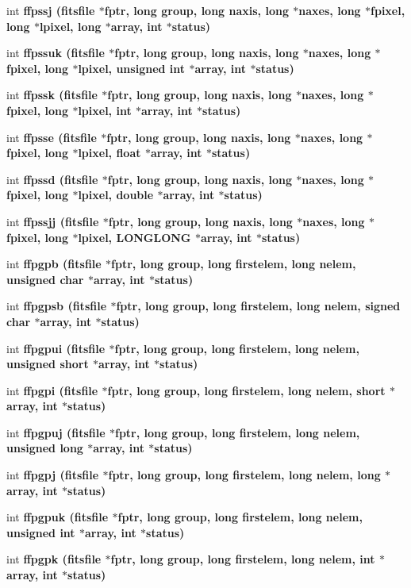 \begin{CompactItemize}
\item 
int \bf{ffpssj} (\bf{fitsfile} $\ast$fptr, long group, long naxis, long $\ast$naxes, long $\ast$fpixel, long $\ast$lpixel, long $\ast$array, int $\ast$status)
\item 
int \bf{ffpssuk} (\bf{fitsfile} $\ast$fptr, long group, long naxis, long $\ast$naxes, long $\ast$fpixel, long $\ast$lpixel, unsigned int $\ast$array, int $\ast$status)
\item 
int \bf{ffpssk} (\bf{fitsfile} $\ast$fptr, long group, long naxis, long $\ast$naxes, long $\ast$fpixel, long $\ast$lpixel, int $\ast$array, int $\ast$status)
\item 
int \bf{ffpsse} (\bf{fitsfile} $\ast$fptr, long group, long naxis, long $\ast$naxes, long $\ast$fpixel, long $\ast$lpixel, float $\ast$array, int $\ast$status)
\item 
int \bf{ffpssd} (\bf{fitsfile} $\ast$fptr, long group, long naxis, long $\ast$naxes, long $\ast$fpixel, long $\ast$lpixel, double $\ast$array, int $\ast$status)
\item 
int \bf{ffpssjj} (\bf{fitsfile} $\ast$fptr, long group, long naxis, long $\ast$naxes, long $\ast$fpixel, long $\ast$lpixel, \bf{LONGLONG} $\ast$array, int $\ast$status)
\item 
int \bf{ffpgpb} (\bf{fitsfile} $\ast$fptr, long group, long firstelem, long nelem, unsigned char $\ast$array, int $\ast$status)
\item 
int \bf{ffpgpsb} (\bf{fitsfile} $\ast$fptr, long group, long firstelem, long nelem, signed char $\ast$array, int $\ast$status)
\item 
int \bf{ffpgpui} (\bf{fitsfile} $\ast$fptr, long group, long firstelem, long nelem, unsigned short $\ast$array, int $\ast$status)
\item 
int \bf{ffpgpi} (\bf{fitsfile} $\ast$fptr, long group, long firstelem, long nelem, short $\ast$array, int $\ast$status)
\item 
int \bf{ffpgpuj} (\bf{fitsfile} $\ast$fptr, long group, long firstelem, long nelem, unsigned long $\ast$array, int $\ast$status)
\item 
int \bf{ffpgpj} (\bf{fitsfile} $\ast$fptr, long group, long firstelem, long nelem, long $\ast$array, int $\ast$status)
\item 
int \bf{ffpgpuk} (\bf{fitsfile} $\ast$fptr, long group, long firstelem, long nelem, unsigned int $\ast$array, int $\ast$status)
\item 
int \bf{ffpgpk} (\bf{fitsfile} $\ast$fptr, long group, long firstelem, long nelem, int $\ast$array, int $\ast$status)

\end{CompactItemize}
